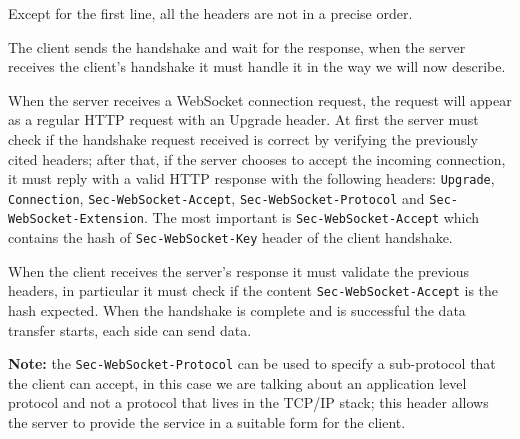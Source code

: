 Except for the first line, all the headers are not in a precise order.\newline

The client sends the handshake and wait for the response, when the server receives the client’s handshake it must handle it in the way we will now describe.\newline

When the server receives a WebSocket connection request, the request will appear as a regular HTTP request with an Upgrade header.\newline
At first the server must check if the handshake request received is correct by verifying the previously cited headers;
after that, if the server chooses to accept the incoming connection, it must reply with a valid HTTP response with the following headers: \texttt{Upgrade}, \texttt{Connection}, \texttt{Sec-WebSocket-Accept}, \texttt{Sec-WebSocket-Protocol} and  \texttt{Sec-WebSocket-Extension}.\newline
The most important is \texttt{Sec-WebSocket-Accept} which contains the hash of \texttt{Sec-WebSocket-Key} header of the client handshake.


When the client receives the server’s response it must validate the previous headers, in particular it must check if the 
content \texttt{Sec-WebSocket-Accept} is the hash expected.\newline
When the handshake is complete and is successful the data transfer starts, each side can send data.\newline

\textbf{Note:} the \texttt{Sec-WebSocket-Protocol} can be used to specify a sub-protocol that the client can accept, in this case we are talking about an application level protocol and not a protocol that lives in the TCP/IP stack; this header allows the server to provide the service in a suitable form for the client.

